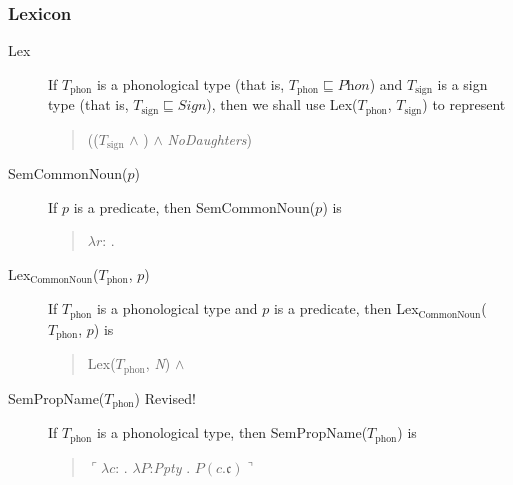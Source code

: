 \subsubsection{Lexicon}
\begin{description}
\item[\textnormal{Lex}] \mbox{}

  If $T_{\mathrm{phon}}$ is a phonological type (that is,
$T_{\mathrm{phon}}\sqsubseteq\textit{Phon}$) and $T_{\mathrm{sign}}$
is a sign type (that is, $T_{\mathrm{sign}}\sqsubseteq\textit{Sign}$), then we shall use
Lex($T_{\mathrm{phon}}$, $T_{\mathrm{sign}}$) to represent
\begin{quote}
(($T_{\mathrm{sign}}$ \d{$\wedge$}
)
\d{$\wedge$} \textit{NoDaughters})
\end{quote}

\item[\textnormal{SemCommonNoun($p$)}] \mbox{}

  If $p$ is a predicate, then SemCommonNoun($p$) is
  \begin{quote}
    $\lambda
r$:
. 
\end{quote}

\item[\textnormal{Lex$_{\mathrm{CommonNoun}}$($T_{\mathrm{phon}}$,
    $p$)}] \mbox{}

  If $T_{\mathrm{phon}}$ is a phonological type and $p$ is a
  predicate, then Lex$_{\mathrm{CommonNoun}}$($T_{\mathrm{phon}}$,
  $p$) is
  \begin{quote}
    Lex($T_{\mathrm{phon}}$, \textit{N}) \d{$\wedge$}
  \end{quote}
  
\item[\textnormal{SemPropName($T_{\text{phon}}$)} Revised!] \mbox{}

  If $T_{\text{phon}}$ is a phonological type, then SemPropName($T_{\text{phon}}$) is
  \begin{quote}
    $\ulcorner\lambda c$:  . $\lambda
                       P$:\textit{Ppty} . $P(c.\mathfrak{c})\urcorner$
  \end{quote}
  

\end{description}
